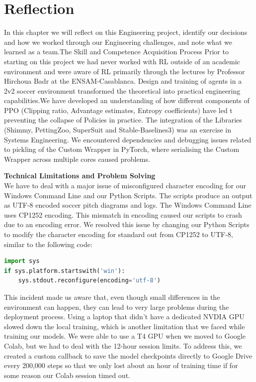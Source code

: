 \chapter{Reflection}
\label{ch:reflection}

In this chapter we will reflect on this Engineering project, identify our decisions and how we worked through our Engineering challenges, and note what we learned as a team.The Skill and Competence Acquisition Process Prior to starting on this project we had never worked with RL outside of an academic environment and were aware of RL primarily through the lectures by Professor Hirchoua Badr at the ENSAM-Casablanca. Design and training of agents in a 2v2 soccer environment transformed the theoretical into practical engineering capabilities.We have developed an understanding of how different components of PPO (Clipping ratio, Advantage estimates, Entropy coefficients) have led t preventing the collapse of Policies in practice. The integration of the Libraries (Shimmy, PettingZoo, SuperSuit and Stable-Baselines3) was an exercise in Systems Engineering. We encountered dependencies and debugging issues related to pickling of the Custom Wrapper in PyTorch, where serialising the Custom Wrapper across multiple cores caused problems.

\bigskip
\noindent\textbf{Technical Limitations and Problem Solving} \\
We have to deal with a major issue of misconfigured character encoding for our Windows Command Line and our Python Scripts. The scripts produce an output as UTF-8 encoded soccer pitch diagrams and logs. The Windows Command Line uses CP1252 encoding. This mismatch in encoding caused our scripts to crash due to an encoding error. We resolved this issue by changing our Python Scripts to modify the character encoding for standard out from CP1252 to UTF-8, similar to the following code:
\begin{lstlisting}[language=Python]
import sys
if sys.platform.startswith('win'):
    sys.stdout.reconfigure(encoding='utf-8')
\end{lstlisting}
This incident made us aware that, even though small differences in the environment can happen, they can lead to very large problems during the deployment process.
Using a laptop that didn't have a dedicated NVDIA GPU slowed down the local training, which is another limitation that we faced while training our models. We were able to use a T4 GPU when we moved to Google Colab, but we had to deal with the 12-hour session limits. To address this, we created a custom callback to save the model checkpoints directly to Google Drive every 200,000 steps so that we only lost about an hour of training time if for some reason our Colab session timed out.

